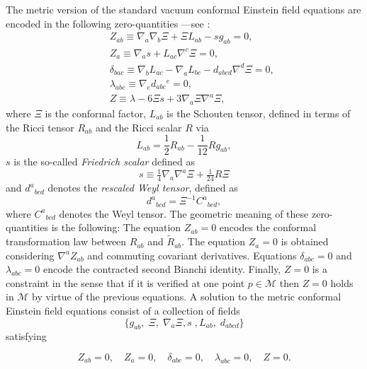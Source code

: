 \documentclass[10pt,a4paper]{article}
\theoremstyle{plain}
\begin{document}
The metric version of the standard vacuum conformal 
Einstein field equations are encoded in the following zero-quantities
  ---see \cite{Fri81a,Fri81b,Fri82,Fri83}:
\begin{subequations}\label{CFE_tensor_zeroquants}
\begin{eqnarray}
&& Z_{ab} \equiv \nabla_{a}\nabla_{b}\Xi  +\Xi L_{ab} - s g_{ab}=0 ,
 \label{StandardCEFEsecondderivativeCF}\\
&& Z_{a} \equiv \nabla_{a}s +L_{ac} \nabla ^{c}\Xi=0 , \label{standardCEFEs}\\
&& \delta_{bac} \equiv \nabla_{b}L_{ac}-\nabla_{a}L_{bc} -
 d_{abcd}\nabla^d{}\Xi =0 , \label{standardCEFESchouten}\\
&& \lambda_{abc}\equiv \nabla_{e}d_{abc}{}^{e}=0 , \label{standardCEFErescaledWeyl}\\
&& Z \equiv \lambda - 6 \Xi s + 3 \nabla_{a}\Xi \nabla^{a}\Xi,
\label{standardCFEconstraintFriedrichScalar}
\end{eqnarray}
\end{subequations}
where $\Xi$ is the conformal factor, $L_{ab}$ is the Schouten tensor,
defined in terms of the Ricci tensor $R_{ab}$ and the Ricci scalar $R$
via
\begin{equation}\label{SchoutenDefinition}
L_{ab}=\frac{1}{2}R_{ab}-\frac{1}{12}Rg_{ab},
\end{equation}
 $s$ is the so-called \emph{Friedrich scalar} defined as
\begin{equation}\label{s-definition}
s\equiv \tfrac{1}{4}\nabla_{a}\nabla^{a}\Xi + \tfrac{1}{24}R\Xi
\end{equation}
and $d^{a}{}_{bcd}$ denotes the \emph{rescaled Weyl tensor}, defined
as
\[d^{a}{}_{bcd}=\Xi^{-1}C^{a}{}_{bcd},\]
where $C^{a}{}_{bcd}$ denotes the Weyl tensor.  The geometric meaning
of these zero-quantities is the following: The equation $Z_{ab}=0$
encodes the conformal transformation law between ${R}_{ab}$ and
$\tilde{R}_{ab}$.  The equation $Z_{a}=0$ is obtained considering
$\nabla^{a}Z_{ab}$ and commuting covariant derivatives.  Equations
$\delta_{abc}=0$ and $\lambda_{abc}=0$ encode the contracted second
Bianchi identity. Finally, $Z=0$ is a constraint in the sense that if
it is verified at one point $p\in\mathcal{M}$ then $Z=0$ holds in
$\mathcal{M}$ by virtue of the previous equations.  A solution to the
metric conformal Einstein field equations consist of a collection of
fields
\[
\{g_{ab}, \; \Xi, \; \nabla_{a}\Xi,s\;,L_{ab},\; d_{abcd}\}
\]
satisfying

\begin{equation}\label{vanishing_CFEs_tensorial_zq}
  Z_{ab}=0, \quad Z_{a}=0, \quad \delta_{abc}=0, \quad \lambda_{abc}=0, \quad Z=0.
\end{equation}
\end{document}
